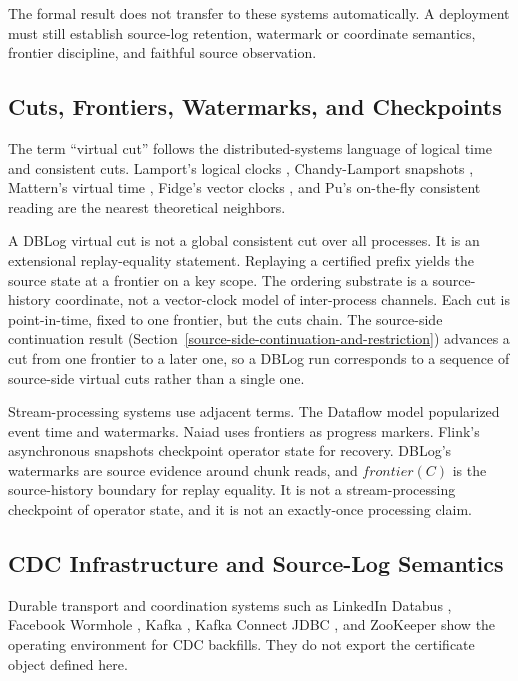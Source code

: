 \documentclass[letterpaper,10pt,twocolumn]{article}
\newcommand{\Frontier}{\mathit{frontier}}
\begin{document}
The formal result does not transfer to these systems automatically. A
deployment must still establish source-log retention, watermark or
coordinate semantics, frontier discipline, and faithful source
observation.

\subsection{Cuts, Frontiers, Watermarks, and
Checkpoints}\label{cuts-frontiers-watermarks-and-checkpoints}

The term ``virtual cut'' follows the distributed-systems language of
logical time and consistent cuts. Lamport's logical clocks
\citep{lamport1978time}, Chandy-Lamport snapshots
\citep{chandy1985snapshots}, Mattern's virtual time
\citep{mattern1989virtual}, Fidge's vector clocks
\citep{fidge1988vector}, and Pu's on-the-fly consistent reading
\citep{pu1986consistentreading} are the nearest theoretical neighbors.

A DBLog virtual cut is not a global consistent cut over all processes.
It is an extensional replay-equality statement. Replaying a certified
prefix yields the source state at a frontier on a key scope. The
ordering substrate is a source-history coordinate, not a vector-clock
model of inter-process channels. Each cut is point-in-time, fixed to one
frontier, but the cuts chain. The source-side continuation result
(Section~\ref{source-side-continuation-and-restriction}) advances a cut
from one frontier to a later one, so a DBLog run corresponds to a
sequence of source-side virtual cuts rather than a single one.

Stream-processing systems use adjacent terms. The Dataflow model
\citep{akidau2015dataflow} popularized event time and watermarks. Naiad
\citep{murray2013naiad} uses frontiers as progress markers. Flink's
asynchronous snapshots \citep{carbone2015asynchronous} checkpoint
operator state for recovery. DBLog's watermarks are source evidence
around chunk reads, and $\Frontier(C)$ is the source-history
boundary for replay equality. It is not a stream-processing checkpoint
of operator state, and it is not an exactly-once processing claim.

\subsection{CDC Infrastructure and Source-Log
Semantics}\label{cdc-infrastructure-and-source-log-semantics}

Durable transport and coordination systems such as LinkedIn Databus
\citep{databus}, Facebook Wormhole \citep{wormhole}, Kafka
\citep{kafka}, Kafka Connect JDBC \citep{kafka_connect_jdbc}, and
ZooKeeper \citep{zookeeper} show the operating environment for CDC
backfills. They do not export the certificate object defined here.
\end{document}
